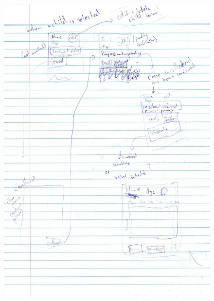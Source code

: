 \documentclass{l3proj}
\begin{document}
{
\begin{figure}[h]
\centering
\includegraphics[scale=0.50]{0085_001-page-003.jpg}
\end{figure}
}

\pagebreak
\end{document}
